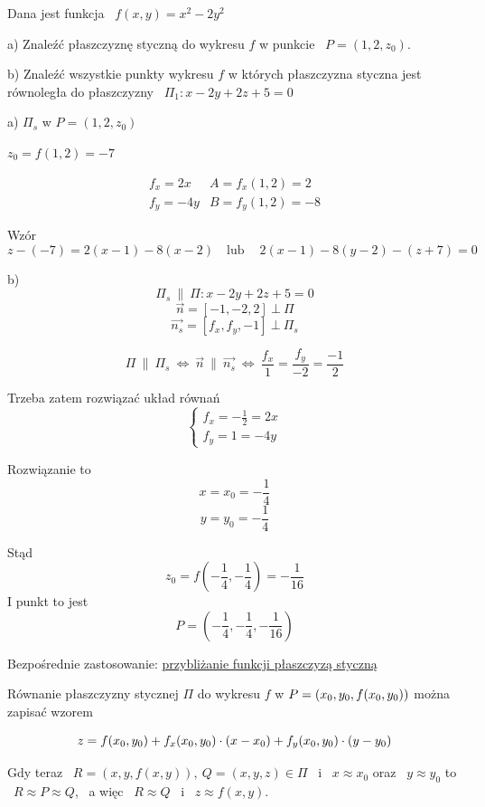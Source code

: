\begin{przykladbig}
    Dana jest funkcja \ $ f(x,y) = x^2 - 2y^2 $

    a) Znaleźć płaszczyznę styczną do wykresu $f$ w punkcie \ $ P = (1, 2, z_0) $.

    b) Znaleźć wszystkie punkty wykresu $f$ w których płaszczyzna styczna jest równoległa do płaszczyzny \ $ \Pi_1: x - 2y + 2z + 5 = 0 $
    \bigskip

    a) $ \Pi_s $ w $ P = (1, 2, z_0)$

    $ z_0 = f(1,2) = -7 $

    \[ \begin{array}{cc}
        f_x = 2x & A = f_x(1,2) = 2 \\
        f_y = -4y & B = f_y(1,2) = -8
    \end{array} \]

    Wzór 
    \[ z - (-7) = 2(x-1) - 8(x-2) \quad \text{lub} \quad \ 2(x-1) - 8(y-2) - (z+7) = 0 \]

    b)
    \[ \Pi_s \ \| \ \Pi : x - 2y + 2z + 5 = 0 \]
    \[ \vec{n} = [-1,-2,2] \ \bot \ \Pi \]
    \[ \vec{n_s} = [f_x, f_y, -1] \ \bot \ \Pi_s \]

    \[ \Pi \ \| \ \Pi_s \ \Leftrightarrow \ \vec{n} \ \| \ \vec{n_s} \ \Leftrightarrow \ \frac{f_x}{1} = \frac{f_y}{-2} = \frac{-1}{2} \]

    Trzeba zatem rozwiązać układ równań
    \[ \begin{cases}
        f_x = -\frac{1}{2} = 2x \\
        f_y = 1 = -4y
    \end{cases} \]

    Rozwiązanie to
    \[ x = x_0 = -\frac{1}{4} \]
    \[ y = y_0 = -\frac{1}{4} \]

    Stąd
    \[ z_0 = f(-\frac{1}{4}, -\frac{1}{4}) = -\frac{1}{16} \]
    I punkt to jest
    \[ P = (-\frac{1}{4}, -\frac{1}{4}, -\frac{1}{16}) \]
\end{przykladbig}

Bezpośrednie zastosowanie: \underline{przybliżanie funkcji płaszczyzą styczną}

Równanie płaszczyzny stycznej $\Pi$ do wykresu $f$ w $P = (x_0, y_0, f(x_0, y_0))$ można zapisać wzorem

\[ z = f(x_0, y_0) + f_x(x_0, y_0) \cdot (x - x_0) + f_y(x_0, y_0) \cdot (y - y_0) \]

Gdy teraz \ $ R = (x, y, f(x,y)), \ Q = (x,y,z) \in \Pi $ \ i \ $ x \approx x_0 $ oraz \ $ y \approx y_0 $ to 
\ $ R \approx P \approx Q $, \ a więc \ $ R \approx Q $ \ i \ $ z \approx f(x,y) $.

